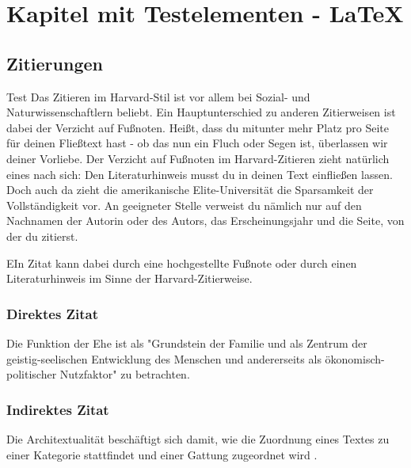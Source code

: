 \chapter{Kapitel mit Testelementen - LaTeX}                                         %
\section{Zitierungen}                                                               %
Test
Das Zitieren im Harvard-Stil ist vor allem bei Sozial- und
Naturwissenschaftlern beliebt. Ein Hauptunterschied zu anderen Zitierweisen
ist dabei der Verzicht auf Fu\ss noten. Hei\ss t, dass du mitunter mehr Platz
pro Seite für deinen Flie\ss text hast - ob das nun ein Fluch oder Segen ist,
\"uberlassen wir deiner Vorliebe. Der Verzicht auf Fu\ss noten im
Harvard-Zitieren zieht nat\"urlich eines nach sich: Den Literaturhinweis
musst du in deinen Text einflie\ss en lassen. Doch auch da zieht die
amerikanische Elite-Universit\"at die Sparsamkeit der Vollst\"andigkeit vor.
An geeigneter Stelle verweist du n\"amlich nur auf den Nachnamen der Autorin
oder des Autors, das Erscheinungsjahr und die Seite, von der du zitierst.\par

EIn Zitat kann dabei durch eine hochgestellte Fu\ss note
 oder durch einen Literaturhinweis im Sinne der
Harvard-Zitierweise.                                                                %

\subsection{Direktes Zitat}                                                         %
Die Funktion der Ehe ist als
"Grundstein der Familie und als Zentrum der geistig-seelischen Entwicklung des
Menschen und andererseits als \"okonomisch-politischer Nutzfaktor"
\autocite{aristotle:physics} zu betrachten.                                         %

\subsection{Indirektes Zitat}
Die Architextualit\"at besch\"aftigt sich damit, wie die Zuordnung eines Textes
zu einer Kategorie stattfindet und einer Gattung zugeordnet wird
\autocite[9]{aristotle:physics}.                                                    %

